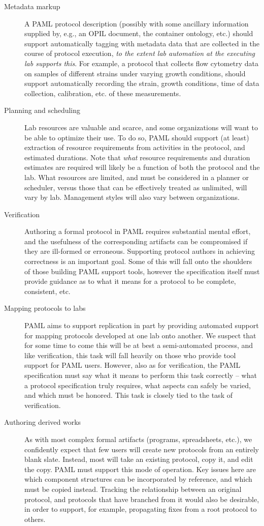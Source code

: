 \begin{description}
\item[Metadata markup] A PAML protocol description (possibly with some ancillary information supplied by, e.g., an OPIL document, the container ontology, etc.) should support automatically tagging with metadata data that are collected in the course of protocol execution, \emph{to the extent lab automation at the executing lab supports this}.  For example, a protocol that collects flow cytometry data on samples of different strains under varying growth conditions, should support automatically recording the strain, growth conditions, time of data collection, calibration, etc. of these measurements.
\item[Planning and scheduling] Lab resources are valuable and scarce, and some organizations will want to be able to optimize their use. To do so, PAML should support (at least) extraction of resource requirements from activities in the protocol, and estimated durations.  Note that \emph{what} resource requirements and duration estimates are required will likely be a function of both the protocol and the lab.  What resources are limited, and must be considered in a planner or scheduler, versus those that can be effectively treated as unlimited, will vary by lab.  Management styles will also vary between organizations.
\item[Verification] Authoring a formal protocol in PAML requires substantial mental effort, and the usefulness of the corresponding artifacts can be compromised if they are ill-formed or erroneous.  Supporting protocol authors in achieving correctness is an important goal. Some of this will fall onto the shoulders of those building PAML support tools, however the specification itself must provide guidance as to what it means for a protocol to be complete, consistent, etc.
\item[Mapping protocols to labs] PAML aims to support replication in part by providing automated support for mapping protocols developed at one lab onto another.  We suspect that for some time to come this will be at best a semi-automated process, and like verification, this task will fall heavily on those who provide tool support for PAML users.  However, also as for verification, the PAML specification must say what it means to perform this task correctly -- what a protocol specification truly requires, what aspects can safely be varied, and which must be honored.  This task is closely tied to the task of verification.
\item[Authoring derived works] As with most complex formal artifacts (programs, spreadsheets, etc.), we confidently expect that few users will create new protocols from an entirely blank slate.  Instead, most will take an existing protocol, copy it, and edit the copy.  PAML must support this mode of operation.  Key issues here are which component structures can be incorporated by reference, and which must be copied instead.  Tracking the relationship between an original protocol, and protocols that have branched from it would also be desirable, in order to support, for example, propagating fixes from a root protocol to others.


\end{description}
